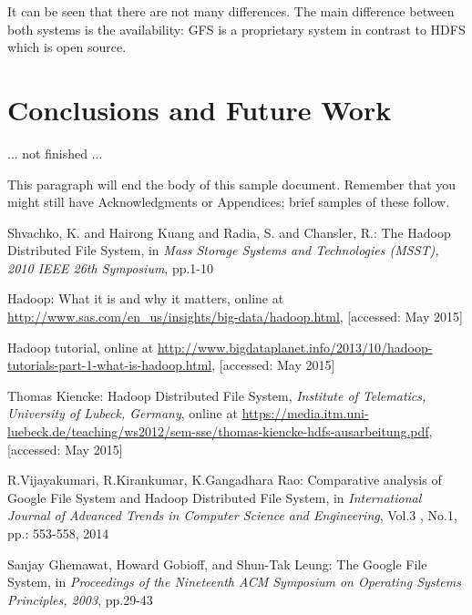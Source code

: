 \documentclass{sig-alternate}
\begin{document}
It can be seen that there are not many differences. The main difference between both systems is the availability: GFS is a proprietary system in contrast to HDFS which is open source.

\section{Conclusions and Future Work}
... not finished ...

This paragraph will end the body of this sample document.
Remember that you might still have Acknowledgments or
Appendices; brief samples of these
follow.




%


\begin{thebibliography}{4}

 Shvachko, K. and Hairong Kuang and Radia, S. and Chansler, R.: The Hadoop Distributed File System, in
\textit{Mass Storage Systems and Technologies (MSST), 2010 IEEE 26th Symposium}, pp.1-10

 Hadoop: What it is and why it matters, online at
\url{http://www.sas.com/en_us/insights/big-data/hadoop.html}, [accessed: May 2015]

 Hadoop tutorial, online at
\url{http://www.bigdataplanet.info/2013/10/hadoop-tutorials-part-1-what-is-hadoop.html}, [accessed: May 2015]

 Thomas Kiencke: Hadoop Distributed File System,
\textit{Institute of Telematics, University of Lubeck, Germany},
 online at
\url{https://media.itm.uni-luebeck.de/teaching/ws2012/sem-sse/thomas-kiencke-hdfs-ausarbeitung.pdf}, [accessed: May 2015]

 R.Vijayakumari, R.Kirankumar, K.Gangadhara Rao: Comparative analysis of Google File System and Hadoop Distributed File System, in \textit{International Journal of Advanced Trends in Computer Science and Engineering}, Vol.3 , No.1, pp.: 553-558, 2014

 Sanjay Ghemawat, Howard Gobioff, and Shun-Tak Leung: The Google File System, in
\textit{Proceedings of the Nineteenth ACM Symposium on Operating Systems Principles, 2003}, pp.29-43

\end{thebibliography}  


\balancecolumns
\end{document}
